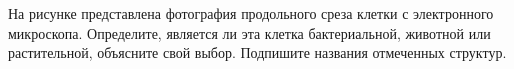 
На рисунке представлена фотография продольного среза клетки с электронного микроскопа. Определите, является ли 
эта клетка бактериальной, животной или растительной,  объясните свой выбор. Подпишите названия отмеченных 
структур.

